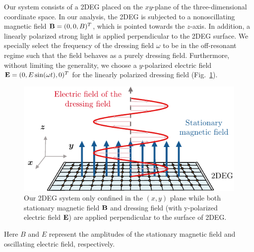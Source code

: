 
Our system consists of a 2DEG placed on the $xy$-plane of the three-dimensional coordinate space. In our analysis, the 2DEG is subjected to a nonoscillating magnetic field $\vb{B} = (0,0,B)^{T}$, which is pointed towards the $z$-axis. In addition, a linearly polarized strong light is applied perpendicular to the 2DEG surface. We specially select the frequency of the dressing field $\omega$ to be in the off-resonant regime such that the field behaves as a purely dressing field. Furthermore, without limiting the generality, we choose a $y$-polarized electric field $\vb{E} = (0,E\sin(\omega t),0)^{T}$ for the linearly polarized dressing field (Fig.~\ref{fig_1}).
\begin{figure}[b]
\includegraphics[scale=0.9]{figures/fig_1}
\caption{\label{fig_1} Our 2DEG system only confined in the $(x,y)$ plane while both stationary magnetic field $\vb{B}$ and dressing field (with y-polarized electric field $\vb{E}$) are applied perpendicular to the surface of 2DEG.}
\end{figure}
Here $B$ and $E$ represent the amplitudes of the stationary magnetic field and oscillating electric field, respectively.

